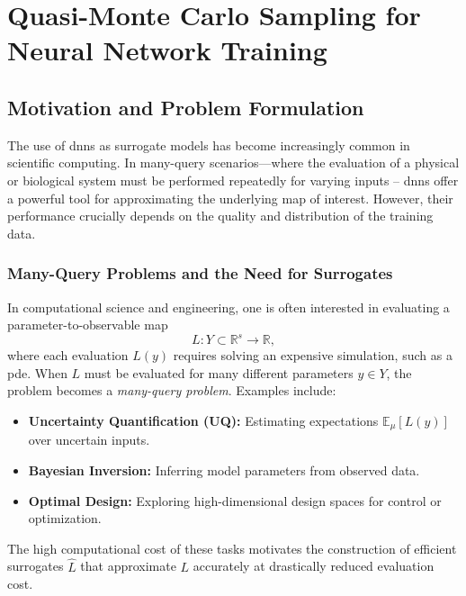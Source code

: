 \part{Quasi-Monte Carlo Sampling for Neural Network Training}
\label{part2}

\chapter{Motivation and Problem Formulation}
\label{chap:qmc-nn-motivation}

The use of \acp{dnn} as surrogate models has become increasingly common in
scientific computing. In many-query scenarios—where the evaluation of a physical
or biological system must be performed repeatedly for varying inputs --
\acsp{dnn} offer a powerful tool for approximating the underlying map of
interest. However, their performance crucially depends on the quality and
distribution of the training data.

\section{Many-Query Problems and the Need for Surrogates}

In computational science and engineering, one is often interested in evaluating
a parameter-to-observable map
\begin{equation*}
    L \colon Y \subset \mathbb{R}^s \to \mathbb{R},
\end{equation*}
where each evaluation $L(y)$ requires solving an expensive simulation, such as a
\ac{pde}. When $L$ must be evaluated for many different parameters $y \in Y$,
the problem becomes a \emph{many-query problem}. Examples include:

\begin{itemize}
    \item \textbf{Uncertainty Quantification (UQ):} Estimating expectations
    $\mathbb{E}_\mu[L(y)]$ over uncertain inputs.
    \item \textbf{Bayesian Inversion:} Inferring model parameters from observed
    data.
    \item \textbf{Optimal Design:} Exploring high-dimensional design spaces for
    control or optimization.
\end{itemize}

The high computational cost of these tasks motivates the construction of
efficient surrogates $\hat{L}$ that approximate $L$ accurately at drastically
reduced evaluation cost.

